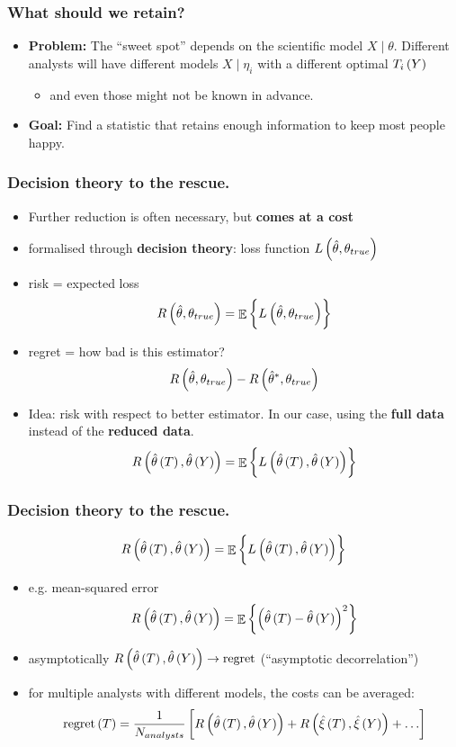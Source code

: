 \documentclass[10pt, compress]{beamer}
\DeclareMathOperator{\E}{\mathbb{E}}
\newcommand{\that}{\hat{\theta}}
\begin{document}
\begin{frame}[fragile]
    \frametitle{What should we retain?}
    \begin{itemize}
        \item \textbf{Problem:} The “sweet spot” depends on the scientific model $X \mid \theta$. Different analysts will have different models $X \mid \eta_i$ with a different optimal $T_i\del{Y}$
            \begin{itemize}
                \item and even those might not be known in advance.
            \end{itemize}
        \item \textbf{Goal:} Find a statistic that retains enough information to keep most people happy.
    \end{itemize}
\end{frame}

\begin{frame}[fragile]
    \frametitle{Decision theory to the rescue.}
    \begin{itemize}
        \item Further reduction is often necessary, but \textbf{comes at a cost}
        \item formalised through \textbf{decision theory}: loss function $L\del{ \hat{\theta}, \theta_{true}}$
        \item risk = expected loss 
            \[ 
                R\del{\hat{\theta},\theta_{true}} = \E{\cbr{L\del{ \hat{\theta}, \theta_{true}}}}
            \]
        \item regret = how bad is this estimator?
            \[
                R\del{\hat{\theta},\theta_{true}} - R\del{\hat{\theta}^*,\theta_{true}}
            \]
        \item Idea: risk with respect to better estimator. In our case, using the \textbf{full data} instead of the \textbf{reduced data}.
                \[
                    R\del{\that\del{T},\that\del{Y}} = \E{\cbr{L\del{ \that\del{T},\that\del{Y} }}}
                \]
    \end{itemize}
\end{frame}
\begin{frame}[fragile]
    \frametitle{Decision theory to the rescue.}
        \[
                R\del{\that\del{T},\that\del{Y}} = \E{\cbr{L\del{ \that\del{T},\that\del{Y} }}}
        \]
    \begin{itemize}
        \item e.g. mean-squared error
            \[
            R\del{\that\del{T},\that\del{Y}} = \E{\cbr{ \del{ \that\del{T}-\that\del{Y} }^2 }} 
            \]
        \item asymptotically $R\del{\that\del{T},\that\del{Y}} \rightarrow \mathrm{regret}$ (“asymptotic decorrelation”)
        \item for multiple analysts with different models, the costs can be averaged:
            \[
                \mathrm{regret}\del{T} = \frac{1}{N_{analysts}}\sbr{R\del{\that\del{T},\that\del{Y}}+R\del{\hat{\xi}\del{T},\hat{\xi}\del{Y}}+\ldots}
            \]
    \end{itemize}
\end{frame}
\end{document}

